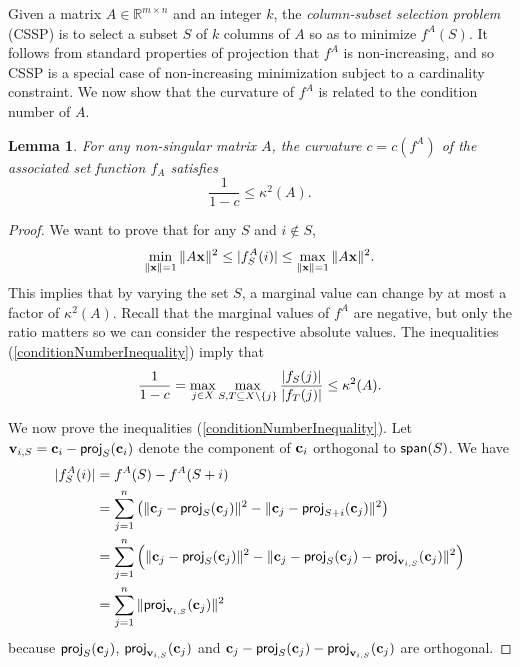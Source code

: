 \documentclass{article}
\newcommand{\reals}{\ensuremath{\mathbb{R}}}
\newtheorem{lemma}[theorem]{Lemma}
\theoremstyle{definition}
\begin{document}
Given a matrix $A \in \reals^{m \times n}$ and an integer $k$, the \emph{column-subset selection problem} (CSSP) is to select a subset $S$ of $k$ columns of $A$ so as to minimize $f^A(S)$.
It follows from standard properties of projection that $f^A$ is non-increasing, and so CSSP is a special case of non-increasing minimization subject to a cardinality constraint.  We now show that the curvature of $f^{A}$ is related to the condition number of $A$.

\begin{lemma}
\label{lem:condition-curvature}
For any non-singular matrix $A$, the curvature $c=c({f^A})$
of the associated set function $f_A$ satisfies 
$$ \frac{1}{1-c} \leq \kappa^2(A).$$
\end{lemma}

\begin{proof}
We want to prove that for any $S$ and $i \notin S$, 
\begin{eqnarray}\label{conditionNumberInequality}
 \min_{\|\mathbf x\|=1} \|A\mathbf x\|^2 \leq  |f^A_S(i)| \leq \max_{\|\mathbf x\|=1} \|A\mathbf x\|^2.
\end{eqnarray}
This implies that by varying the set $S$, a marginal value can change by at most a factor of $\kappa^2(A)$. 
Recall that the marginal values of $f^A$ are negative, but only the ratio matters so we can consider the respective absolute values. 
The inequalities (\ref{conditionNumberInequality}) imply that 
$$ \frac{1}{1-c}=\max_{j \in X} \max_{S,T \subseteq X \setminus \{j\}}\frac{|f_S(j)|}{|f_T(j)|}   \leq \kappa^2(A).$$

We now prove the  inequalities (\ref{conditionNumberInequality}). Let $\mathbf v_{i,S} = \mathbf c_i - \mathsf{proj}_S(\mathbf c_i)$ denote the component of $\mathbf c_i$ orthogonal to $\mathsf{span}(S)$.
We have
\begin{align*}
|f^A_S(i)| &=  f^A(S) - f^A(S+i) \\
&= \sum_{j=1}^{n} \left( \|\mathbf c_j - \mathsf{proj}_S(\mathbf c_j)\|^2 - \|\mathbf c_j - \mathsf{proj}_{S+i}(\mathbf c_j)\|^2 \right) \\
&= \sum_{j=1}^{n} \left( \|\mathbf c_j - \mathsf{proj}_S(\mathbf c_j)\|^2 - \|\mathbf c_j - \mathsf{proj}_{S}(\mathbf c_j) - \mathsf{proj}_{\mathbf v_{i,S}}(\mathbf c_j) \|^2 \right) \\
&= \sum_{j=1}^{n} \| \mathsf{proj}_{\mathbf v_{i,S}}(\mathbf c_j) \|^2
\end{align*}
because $\mathsf{proj}_S(\mathbf c_j)$, $\mathsf{proj}_{\mathbf v_{i,S}}(\mathbf c_j)$ and $\mathbf c_j - \mathsf{proj}_{S}(\mathbf c_j) - \mathsf{proj}_{\mathbf v_{i,S}}(\mathbf c_j)$ are orthogonal.



\end{proof}
\end{document}

